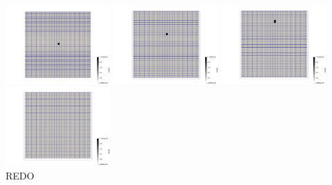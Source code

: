\begin{center}
\includegraphics[width=4cm]{python_codes/fieldstone_89/results/vertical/target0000}
\includegraphics[width=4cm]{python_codes/fieldstone_89/results/vertical/target0005}
\includegraphics[width=4cm]{python_codes/fieldstone_89/results/vertical/target0010}
\includegraphics[width=4cm]{python_codes/fieldstone_89/results/vertical/target0015}\\
REDO
\end{center}

